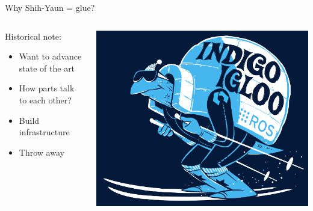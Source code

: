 \documentclass{beamer}
\begin{document}
\begin{frame}{Why Shih-Yaun = glue?}
\begin{columns}
	\begin{column}{0.55\textwidth}
Historical note:
		\begin{itemize}
			\item Want to advance state of the art
                        \item How parts talk to each other?
                        \item Build infrastructure
			\item Throw away 
		\end{itemize} \end{column} \begin{column}{0.45\textwidth} \centering \includegraphics[width=\textwidth]{fig/indigoigloo_600.png} \end{column}
\end{columns}

\end{frame}
\end{document}
